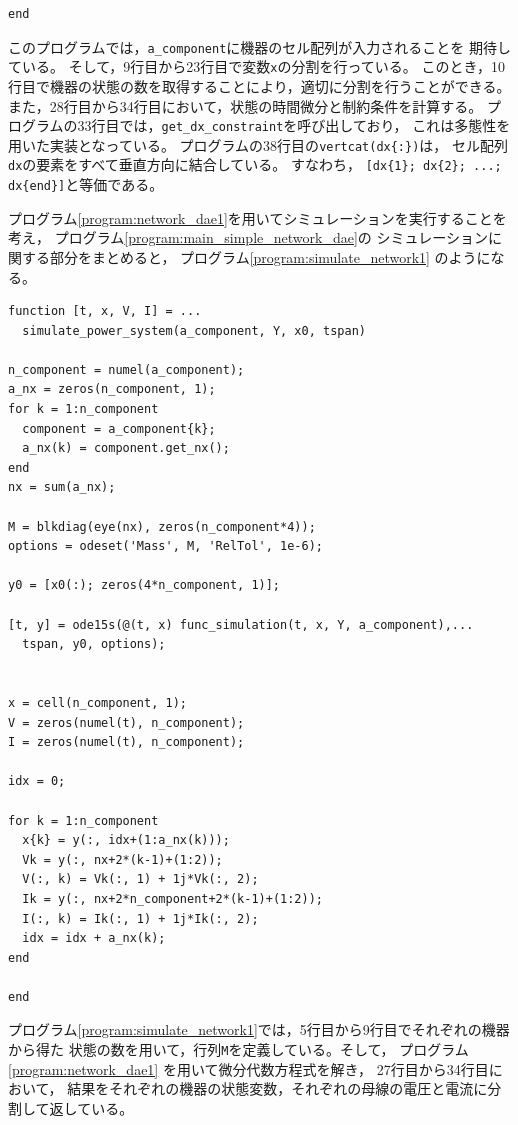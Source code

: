\documentclass[tombow,dvipdfmx]{corona-a5-1.1}
\begin{document}
\begin{例}[発電機と負荷のモジュール化]
\begin{PROGRAMA}[count,title={func\_simulation.m}]
\begin{verbatim}
end
\end{verbatim}
\end{PROGRAMA}
このプログラムでは，\verb|a_component|に機器のセル配列が入力されることを
期待している。
そして，9行目から23行目で変数\verb|x|の分割を行っている。
このとき，10行目で機器の状態の数を取得することにより，適切に分割を行うことができる。
また，28行目から34行目において，状態の時間微分と制約条件を計算する。
プログラムの33行目では，\verb|get_dx_constraint|を呼び出しており，
これは多態性を用いた実装となっている。
プログラムの38行目の\verb|vertcat(dx{:})|は，
セル配列\verb|dx|の要素をすべて垂直方向に結合している。
すなわち，
\verb|[dx{1}; dx{2}; ...; dx{end}]|と等価である。

プログラム\nobreak\ref{program:network_dae1}を用いてシミュレーションを実行することを考え，
プログラム\nobreak\ref{program:main_simple_network_dae}の
シミュレーションに関する部分をまとめると，
プログラム\nobreak\ref{program:simulate_network1}
のようになる。
\begin{PROGRAMA}[count,title={simulate\_power\_system.m}]\label{program:simulate_network1}
\begin{verbatim}
function [t, x, V, I] = ...
  simulate_power_system(a_component, Y, x0, tspan)

n_component = numel(a_component);
a_nx = zeros(n_component, 1);
for k = 1:n_component
  component = a_component{k};
  a_nx(k) = component.get_nx();
end
nx = sum(a_nx);

M = blkdiag(eye(nx), zeros(n_component*4));
options = odeset('Mass', M, 'RelTol', 1e-6);

y0 = [x0(:); zeros(4*n_component, 1)];

[t, y] = ode15s(@(t, x) func_simulation(t, x, Y, a_component),...
  tspan, y0, options);


x = cell(n_component, 1);
V = zeros(numel(t), n_component);
I = zeros(numel(t), n_component);

idx = 0;

for k = 1:n_component
  x{k} = y(:, idx+(1:a_nx(k)));
  Vk = y(:, nx+2*(k-1)+(1:2));
  V(:, k) = Vk(:, 1) + 1j*Vk(:, 2);
  Ik = y(:, nx+2*n_component+2*(k-1)+(1:2));
  I(:, k) = Ik(:, 1) + 1j*Ik(:, 2);
  idx = idx + a_nx(k);
end

end
\end{verbatim}
\end{PROGRAMA}

プログラム\nobreak\ref{program:simulate_network1}では，5行目から9行目でそれぞれの機器から得た
状態の数を用いて，行列\verb|M|を定義している。そして，
プログラム\nobreak\ref{program:network_dae1}
を用いて微分代数方程式を解き，
27行目から34行目において，
結果をそれぞれの機器の状態変数，それぞれの母線の電圧と電流に分割して返している。


\end{例}
\end{document}
